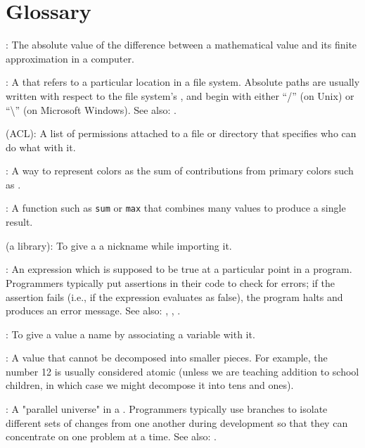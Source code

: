 \chapter{Glossary}\label{s:gloss}

:
The absolute value of the difference between a mathematical value
and its finite approximation in a computer.

:
A  that refers to a
particular location in a file system. Absolute paths are usually written
with respect to the file system's , and begin with either ``/'' (on Unix) or
``\textbackslash{}'' (on Microsoft Windows). See also:
.

 (ACL):
A list of permissions attached to a file or directory
that specifies who can do what with it.

:
A way to represent colors as the sum of
contributions from primary colors such as .

:
A function such as \texttt{sum} or
\texttt{max} that combines many values to produce a single result.

 (a library):
To give a  a
nickname while importing it.

:
An expression which is supposed to be true at a
particular point in a program. Programmers typically put assertions in
their code to check for errors; if the assertion fails (i.e., if the
expression evaluates as false), the program halts and produces an error
message. See also: ,
,
.

:
To give a value a name by associating a variable
with it.

:
A value that cannot be decomposed into smaller
pieces. For example, the number 12 is usually considered atomic (unless
we are teaching addition to school children, in which case we might
decompose it into tens and ones).

:
A "parallel universe" in a  .
Programmers typically use branches to isolate different sets of changes from one another during development
so that they can concentrate on one problem at a time.
See also: .

